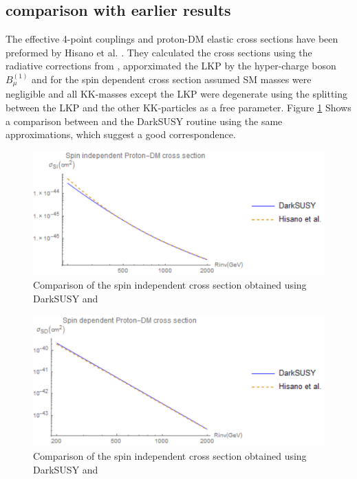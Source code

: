 \documentclass{article}
\begin{document}
\subsection{comparison with earlier results}

The effective 4-point couplings and proton-DM elastic cross sections have been preformed by Hisano et al. \cite{1012}.  They calculated the cross sections using the radiative corrections from \cite{oldcorrections}, apporximated the LKP by the hyper-charge boson  $B^{(1)}_\mu$ and for the spin dependent cross section assumed SM masses were negligible and all KK-masses except the LKP were degenerate using the splitting between the LKP and the other KK-particles as a free parameter.  Figure \ref{si1012} Shows a comparison between \cite{1012} and the DarkSUSY routine using the same approximations, which suggest a good correspondence. 


\begin{figure}[H]
    \centering
    \includegraphics{SI1012.pdf}
      \caption{Comparison of the spin independent cross section obtained using DarkSUSY and \cite{1012}}
    \label{si1012}
\end{figure}

\begin{figure}[H]
    \centering
    \includegraphics{SD1012.pdf}
    \caption{Comparison of the spin independent cross section obtained using DarkSUSY and \cite{1012}}
    \label{SD1012}
\end{figure}
\end{document}
